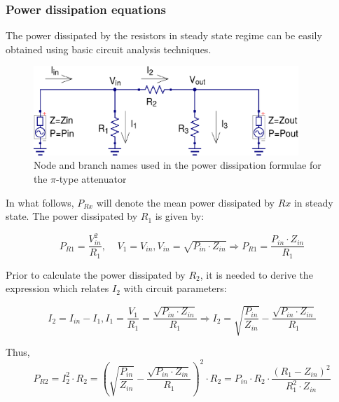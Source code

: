 \subsubsection{Power dissipation equations}

The power dissipated by the resistors in steady state regime can be easily obtained using basic circuit analysis techniques.

\begin{figure}[ht]
\begin{center}
\includegraphics[width=10cm]{Pi-Type-Power-Dissipation}
\end{center}
\caption{Node and branch names used in the power dissipation formulae for the $\pi$-type attenuator}
\label{fig:pi_attenuator_power_dissipation}
\end{figure}
\FloatBarrier

\noindent In what follows, $P_{Rx}$ will denote the mean power dissipated by $Rx$ in steady state. The power dissipated by $R_1$ is given by:

\begin{equation}
P_{R1} = \dfrac{V_{in}^2}{R_{1}}, \;\;\;\; V_{1} = V_{in}, V_{in} = \sqrt{P_{in}\cdot Z_{in}}  \Rightarrow P_{R1} = \dfrac{P_{in} \cdot Z_{in}}{R_{1}}
\end{equation}

\noindent Prior to calculate the power dissipated by $R_2$, it is needed to derive the expression which relates $I_{2}$ with circuit parameters:

\begin{equation}
I_{2} = I_{in} - I_{1}, I_{1} = \dfrac{V_{1}}{R_{1}} = \dfrac{\sqrt{P_{in} \cdot Z_{in}}}{R_{1}} \Rightarrow I_{2} = \sqrt{\dfrac{P_{in}}{Z_{in}}} - \dfrac{\sqrt{P_{in} \cdot Z_{in}}}{R_{1}}
\end{equation}

\noindent Thus,
\begin{equation}
P_{R2} = I_{2}^2 \cdot R_{2} = \left( \sqrt{\dfrac{P_{in}}{Z_{in}}} - \dfrac{\sqrt{P_{in} \cdot Z_{in}}}{R_{1}} \right)^2 \cdot R_{2} = P_{in} \cdot R_{2} \cdot \dfrac{(R_{1} - Z_{in})^2}{R_{1}^2 \cdot Z_{in}}
\end{equation}

